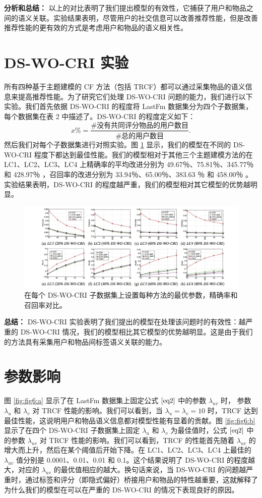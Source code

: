 \textbf{分析和总结：} 以上的对比表明了我们提出模型的有效性，它捕获了用户和物品之间的语义关联。实验结果表明，尽管用户的社交信息可以改善推荐性能，但是改善推荐性能的更有效的方式是考虑用户和物品的语义相关性。


\section{DS-WO-CRI 实验}
所有四种基于主题建模的 CF 方法（包括 TRCF）都可以通过采集物品的语义信息来提高推荐性能。为了研究它们处理 DS-WO-CRI 问题的能力，我们进行以下实验。我们首先依据 DS-WO-CRI 的程度将 LastFm 数据集分为四个子数据集，每个数据集在表 2 中描述了。DS-WO-CRI 的程度定义如下：
$$
x\% = \frac{\#\text{没有共同评分物品的用户数目}}{\#\text{总的用户数目}}.
$$
然后我们对每个子数据集进行对照实验。图 \ref{fig:fig5} 显示，我们的模型在不同的 DS-WO-CRI 程度下都达到最佳性能。我们的模型相对于其他三个主题建模方法的在 LC1、LC2、LC3、LC4 上精确率的平均改进分别为 49.67％、75.81％、345.77％ 和 428.97％ ，召回率的改进分别为 33.94％、65.00％、383.63 ％ 和 458.00％ 。实验结果表明，DS-WO-CRI 的程度越严重，我们的模型相对其它模型的优势越明显。
\begin{figure}
\includegraphics[width=\linewidth]{images/figure5.jpg}
\caption{在每个 DS-WO-CRI 子数据集上设置每种方法的最优参数，精确率和召回率对比。}
\label{fig:fig5}
\end{figure}

\textbf{总结：} DS-WO-CRI 实验表明了我们提出的模型在处理该问题时的有效性：越严重的 DS-WO-CRI 情况，我们的模型相比其它模型的优势越明显。这是由于我们的方法具有采集用户和物品间标签语义关联的能力。


\section{参数影响}
图 \ref{fig:fig6:a} 显示了在 LastFm 数据集上固定公式 $\eqref{eq2}$ 中的参数 $\lambda_{uv} $ 时， 参数 $\lambda_u$ 和 $\lambda_v$ 对 TRCF 性能的影响。我们可以看到，当 $\lambda_u = \lambda_v = 10$ 时，TRCF 达到最佳性能，这说明用户和物品语义信息都对模型性能有显着的贡献。图 \ref{fig:fig6:b} 显示了在四个 DS-WO-CRI 子数据集上固定 $\lambda_u$ 和 $\lambda_v$ 为最佳值时，公式 $\eqref{eq2}$ 中的参数 $\lambda_{uv} $ 对 TRCF 性能的影响。我们可以看到，TRCF 的性能首先随着 $\lambda_{uv} $ 的增大而上升，然后在某个阈值后开始下降。在 LC1、LC2、LC3、LC4 上最佳的 $\lambda_{uv}$ 值分别是 0.0001、0.01、0.01 和 0.1。这个结果说明了 DS-WO-CRI 的程度越大，对应的 $\lambda_{uv}$ 的最优值相应的越大。换句话来说，当 DS-WO-CRI 的问题越严重时，通过标签和评分（即隐式偏好）桥接用户和物品的特性越重要，这就解释了为什么我们的模型在可以在严重的 DS-WO-CRI 的情况下表现良好的原因。


